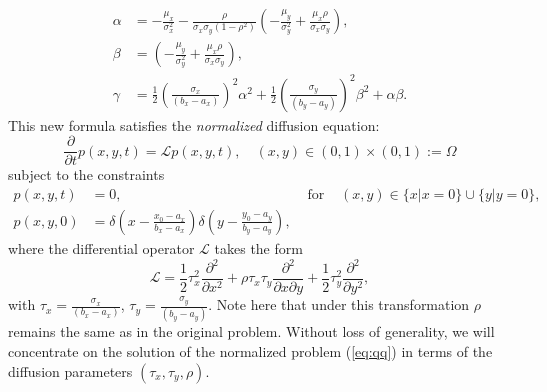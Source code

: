 \documentclass[10pt]{article}
\begin{document}
\begin{align*}
  \alpha &= -\frac{\mu_x}{\sigma_x^2} - \frac{\rho}{\sigma_x\sigma_y(1-\rho^2)}\left( -\frac{\mu_y}{\sigma_y^2} + \frac{\mu_x \rho}{\sigma_x \sigma_y} \right), \\
  \beta &= \left( -\frac{\mu_y}{\sigma_y^2} + \frac{\mu_x \rho}{\sigma_x \sigma_y} \right), \\
  \gamma &= \frac{1}{2}\left( \frac{\sigma_x}{(b_x-a_x)} \right)^2 \alpha^2 + \frac{1}{2}\left(\frac{\sigma_y}{(b_y-a_y)}\right)^2 \beta^2 + \alpha\beta.
\end{align*}
This new formula satisfies the \textit{normalized} diffusion equation:
\begin{equation}
  \frac{\partial}{\partial t} p(x,y,t) = \mathcal{L}p(x,y,t),\quad (x,y) \in (0,1) \times (0,1) := \Omega \label{eq:qq}
\end{equation}
subject to the constraints
\begin{align}
  p(x,y,t) &=0, & \mbox{ for } & (x,y) \in \{ x | x = 0\} \cup \{ y | y = 0\}, \nonumber \\
  p(x,y,0) &= \delta\left( x - \frac{x_0-a_x}{b_x - a_x} \right) \delta\left(y-\frac{y_0 - a_y}{b_y - a_y}\right), \nonumber
\end{align}
where the differential operator $\mathcal{L}$ takes the form
\[
  \mathcal{L} = \frac{1}{2} \tau_x^2 \frac{\partial^2}{\partial x^2}
  + \rho\tau_x\tau_y \frac{\partial^2}{\partial x \partial y} + \frac{1}{2}\tau_y^2 \frac{\partial^2}{\partial y^2},
\]
with $\tau_x = \frac{\sigma_x}{(b_x-a_x)}$,
$\tau_y = \frac{\sigma_y}{(b_y-a_y)}$.  Note here that under this
transformation $\rho$ remains the same as in the original
problem. Without loss of generality, we will concentrate on the
solution of the normalized problem (\ref{eq:qq}) in terms of the
diffusion parameters $(\tau_x, \tau_y, \rho)$.
\end{document}
